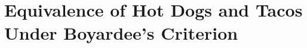 \chapter{Equivalence of Hot Dogs and Tacos Under Boyardee's Criterion}
\label{paper1}





\pagebreak
\singlespacing
{}
\doublespacing

